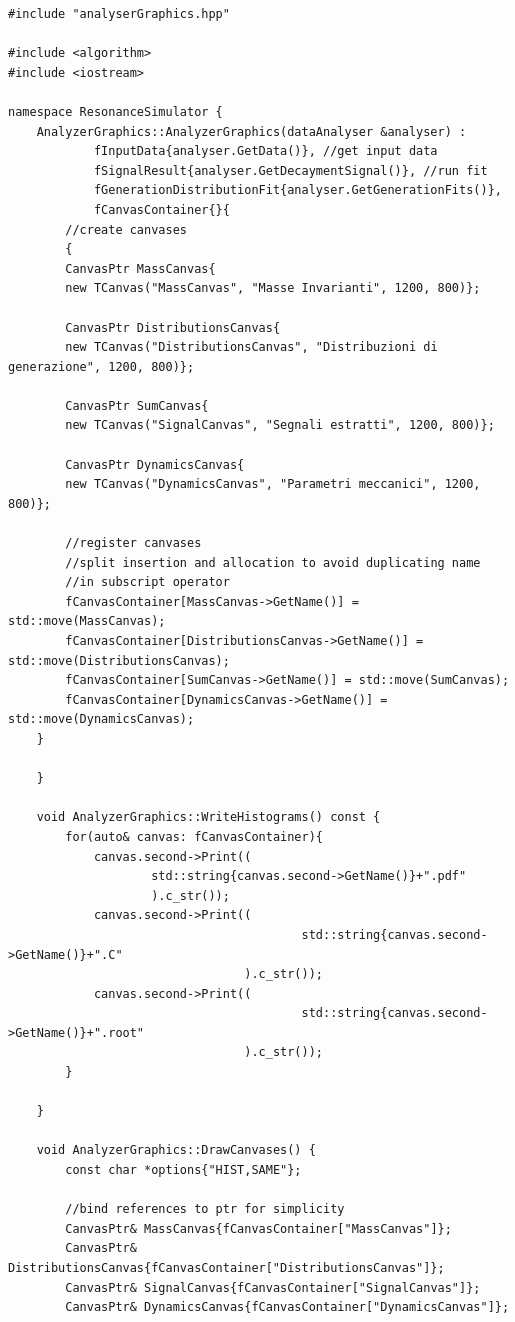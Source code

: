 \documentclass[12pt, a4paper]{article}
\begin{document}
\begin{verbatim}
#include "analyserGraphics.hpp"

#include <algorithm>
#include <iostream>

namespace ResonanceSimulator {
    AnalyzerGraphics::AnalyzerGraphics(dataAnalyser &analyser) :
            fInputData{analyser.GetData()}, //get input data
            fSignalResult{analyser.GetDecaymentSignal()}, //run fit
            fGenerationDistributionFit{analyser.GetGenerationFits()},
            fCanvasContainer{}{
        //create canvases
        {
        CanvasPtr MassCanvas{
        new TCanvas("MassCanvas", "Masse Invarianti", 1200, 800)};
        
        CanvasPtr DistributionsCanvas{
        new TCanvas("DistributionsCanvas", "Distribuzioni di generazione", 1200, 800)};
        
        CanvasPtr SumCanvas{
        new TCanvas("SignalCanvas", "Segnali estratti", 1200, 800)};
        
        CanvasPtr DynamicsCanvas{
        new TCanvas("DynamicsCanvas", "Parametri meccanici", 1200, 800)};

        //register canvases
        //split insertion and allocation to avoid duplicating name
        //in subscript operator
        fCanvasContainer[MassCanvas->GetName()] = std::move(MassCanvas);
        fCanvasContainer[DistributionsCanvas->GetName()] = std::move(DistributionsCanvas);
        fCanvasContainer[SumCanvas->GetName()] = std::move(SumCanvas);
        fCanvasContainer[DynamicsCanvas->GetName()] = std::move(DynamicsCanvas);
    }

    }

    void AnalyzerGraphics::WriteHistograms() const {
        for(auto& canvas: fCanvasContainer){
            canvas.second->Print((
                    std::string{canvas.second->GetName()}+".pdf"
                    ).c_str());
            canvas.second->Print((
                                         std::string{canvas.second->GetName()}+".C"
                                 ).c_str());
            canvas.second->Print((
                                         std::string{canvas.second->GetName()}+".root"
                                 ).c_str());
        }

    }

    void AnalyzerGraphics::DrawCanvases() {
        const char *options{"HIST,SAME"};

        //bind references to ptr for simplicity
        CanvasPtr& MassCanvas{fCanvasContainer["MassCanvas"]};
        CanvasPtr& DistributionsCanvas{fCanvasContainer["DistributionsCanvas"]};
        CanvasPtr& SignalCanvas{fCanvasContainer["SignalCanvas"]};
        CanvasPtr& DynamicsCanvas{fCanvasContainer["DynamicsCanvas"]};


\end{verbatim}
\end{document}
